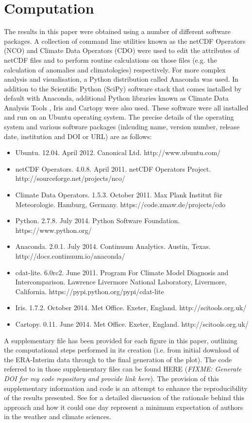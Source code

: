 \section{Computation}\label{s:computation}

The results in this paper were obtained using a number of different software packages. A collection of command line utilities known as the netCDF Operators (NCO) and Climate Data Operators (CDO) were used to edit the attributes of netCDF files and to perform routine calculations on those files (e.g. the calculation of anomalies and climatologies) respectively. For more complex analysis and visualisation, a Python distribution called Anaconda was used. In addition to the Scientific Python (SciPy) software stack that comes installed by default with Anaconda, additional Python libraries known as Climate Data Analysis Tools \citep[CDAT;][]{Doutriaux2009}, Iris and Cartopy were also used. These software were all installed and run on an Ubuntu operating system. The precise details of the operating system and various software packages (inlcuding name, version number, release date, institution and DOI or URL) are as follows:
\begin{itemize}
\item Ubuntu. 12.04. April 2012. Canonical Ltd. http://www.ubuntu.com/
\item netCDF Operators. 4.0.8. April 2011. netCDF Operators Project. http://sourceforge.net/projects/nco/
\item Climate Data Operators. 1.5.3. October 2011. Max Plank Institut f{\"u}r Meteorologie. Hamburg, Germany. https://code.zmaw.de/projects/cdo
\item Python. 2.7.8. July 2014. Python Software Foundation. https://www.python.org/
\item Anaconda. 2.0.1. July 2014. Continuum Analytics. Austin, Texas. http://docs.continuum.io/anaconda/
\item cdat-lite. 6.0rc2. June 2011. Program For Climate Model Diagnosis and Intercomparison. Lawrence Livermore National Laboratory, Livermore, California. https://pypi.python.org/pypi/cdat-lite
\item Iris. 1.7.2. October 2014. Met Office. Exeter, England. http://scitools.org.uk/
\item Cartopy. 0.11. June 2014. Met Office. Exeter, England. http://scitools.org.uk/
\end{itemize}

A supplementary file has been provided for each figure in this paper, outlining the computational steps performed in its creation (i.e. from initial download of the ERA-Interim data through to the final generation of the plot). The code referred to in those supplementary files can be found HERE (\textit{FIXME: Generate DOI for my code repository and provide link here}). The provision of this supplementary information and code is an attempt to enhance the reproducibility of the results presented. See \citet{Irving2015} for a detailed discussion of the rationale behind this approach and how it could one day represent a minimum expectation of authors in the weather and climate sciences. 